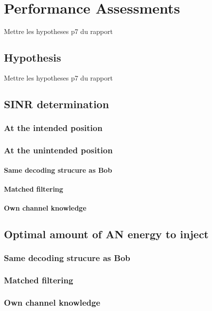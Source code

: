 \documentclass[journal,comsoc]{IEEEtran}
\begin{document}
\section{Performance Assessments}
{\color{red} Mettre les hypotheses p7 du rapport}

\subsection{Hypothesis}
{\color{red} Mettre les hypotheses p7 du rapport}

\subsection{SINR determination}
\subsubsection{At the intended position}

\subsubsection{At the unintended position}
\paragraph{Same decoding strucure as Bob}
\paragraph{Matched filtering}
\paragraph{Own channel knowledge}

\subsection{Optimal amount of AN energy to inject}
\subsubsection{Same decoding strucure as Bob}
\subsubsection{Matched filtering}
\subsubsection{Own channel knowledge}
\end{document}
